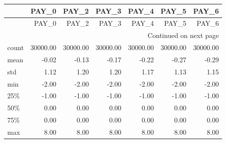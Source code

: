 \begin{longtable}{lrrrrrr}
\toprule
{} &    PAY\_0 &    PAY\_2 &    PAY\_3 &    PAY\_4 &    PAY\_5 &    PAY\_6 \\
\midrule
\endfirsthead

\toprule
{} &    PAY\_0 &    PAY\_2 &    PAY\_3 &    PAY\_4 &    PAY\_5 &    PAY\_6 \\
\midrule
\endhead
\midrule
\multicolumn{7}{r}{{Continued on next page}} \\
\midrule
\endfoot

\bottomrule
\endlastfoot
count & 30000.00 & 30000.00 & 30000.00 & 30000.00 & 30000.00 & 30000.00 \\
mean  &    -0.02 &    -0.13 &    -0.17 &    -0.22 &    -0.27 &    -0.29 \\
std   &     1.12 &     1.20 &     1.20 &     1.17 &     1.13 &     1.15 \\
min   &    -2.00 &    -2.00 &    -2.00 &    -2.00 &    -2.00 &    -2.00 \\
25\%   &    -1.00 &    -1.00 &    -1.00 &    -1.00 &    -1.00 &    -1.00 \\
50\%   &     0.00 &     0.00 &     0.00 &     0.00 &     0.00 &     0.00 \\
75\%   &     0.00 &     0.00 &     0.00 &     0.00 &     0.00 &     0.00 \\
max   &     8.00 &     8.00 &     8.00 &     8.00 &     8.00 &     8.00 \\
\end{longtable}
